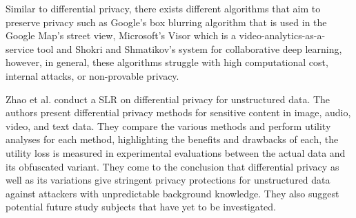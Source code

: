 Similar to differential privacy, there exists different algorithms that aim to
preserve privacy such as Google's box blurring algorithm \cite{FromeLarge}
that is used in the Google Map's street view, Microsoft's Visor \cite{poddar2020visor}
which is a video-analytics-as-a-service tool and Shokri and Shmatikov's
\cite{ShokriPrivacy} system for collaborative deep learning, however, in
general, these algorithms struggle with high computational cost, internal
attacks, or non-provable privacy.


Zhao et al. \cite{ZhaoSurvey} conduct a SLR on differential privacy for
unstructured data. The authors present differential privacy methods for
sensitive content in image, audio, video, and text data. They compare the
various methods and perform utility analyses for each method, highlighting
the benefits and drawbacks of each, the utility loss is measured in experimental
evaluations between the actual data and its obfuscated variant. They come
to the conclusion that differential privacy as well as its variations give
stringent privacy protections for unstructured data against attackers with
unpredictable background knowledge. They also suggest potential future study
subjects that have yet to be investigated.


